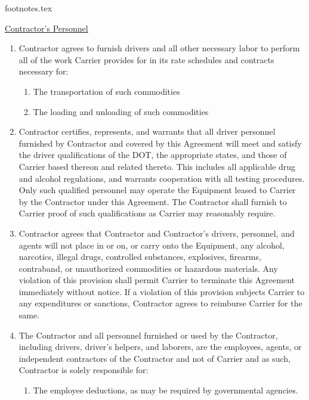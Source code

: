 {
    {footnotes.tex}

    \underline{Contractor's Personnel}
    \begin{enumerate}[
        ref = \SecondLevelEnumerator
    ]
        \item Contractor agrees to furnish drivers and all other necessary
        labor to perform all of the work Carrier provides for in its rate
        schedules and contracts necessary for:
        \begin{enumerate}[
            ref = \ThirdLevelEnumerator
        ]
            \item The transportation of such commodities
            
            \item The loading and unloading of such commodities
        \end{enumerate}

        \item Contractor certifies, represents, and warrants that all
        driver personnel furnished by Contractor and covered by this
        Agreement will meet and satisfy the driver qualifications of the
        DOT, the appropriate states, and those of Carrier based thereon and
        related thereto. This includes all applicable drug and alcohol
        regulations, and warrants cooperation with all testing procedures.
        Only such qualified personnel may operate the Equipment leased to
        Carrier by the Contractor under this Agreement. The Contractor
        shall furnish to Carrier proof of such qualifications as Carrier
        may reasonably require.

        \item Contractor agrees that Contractor and Contractor's drivers,
        personnel, and agents will not place in or on, or carry onto the
        Equipment, any alcohol, narcotics, illegal drugs, controlled
        substances, explosives, firearms, contraband, or unauthorized
        commodities or hazardous materials. Any violation of this provision
        shall permit Carrier to terminate this Agreement immediately
        without notice. If a violation of this provision subjects Carrier
        to any expenditures or sanctions, Contractor agrees to reimburse
        Carrier for the same.

        \item The Contractor and all personnel furnished or used by the
        Contractor, including drivers, driver's helpers, and laborers, are
        the employees, agents, or independent contractors of the Contractor
        and not of Carrier and as such, Contractor is solely responsible
        for:
        \begin{enumerate}[
            ref = \ThirdLevelEnumerator
        ]
            \item The employee deductions, as may be required by
            governmental agencies.
            

\end{enumerate}
\end{enumerate}}
